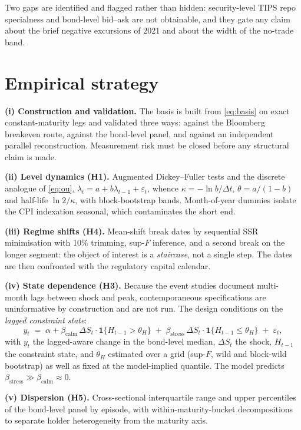 \documentclass[11pt]{article}
\begin{document}
Two gaps are identified and flagged rather than hidden: security-level TIPS repo specialness and bond-level bid--ask are not obtainable, and they gate any claim about the brief negative excursions of 2021 and about the width of the no-trade band.

\section{Empirical strategy}

\textbf{(i) Construction and validation.} The basis is built from \eqref{eq:basis} on exact constant-maturity legs and validated three ways: against the Bloomberg breakeven route, against the bond-level panel, and against an independent parallel reconstruction. Measurement risk must be closed before any structural claim is made.

\textbf{(ii) Level dynamics (H1).} Augmented Dickey--Fuller tests and the discrete analogue of \eqref{eq:ou}, $\lambda_t=a+b\lambda_{t-1}+\varepsilon_t$, whence $\kappa=-\ln b/\Delta t$, $\theta=a/(1-b)$ and half-life $\ln 2/\kappa$, with block-bootstrap bands. Month-of-year dummies isolate the CPI indexation seasonal, which contaminates the short end.

\textbf{(iii) Regime shifts (H4).} Mean-shift break dates by sequential SSR minimisation with 10\% trimming, sup-$F$ inference, and a second break on the longer segment: the object of interest is a \emph{staircase}, not a single step. The dates are then confronted with the regulatory capital calendar.

\textbf{(iv) State dependence (H3).} Because the event studies document multi-month lags between shock and peak, contemporaneous specifications are uninformative by construction and are not run. The design conditions on the \emph{lagged constraint state}:
\begin{equation}
y_t \;=\; \alpha+\beta_{\text{calm}}\,\Delta S_t\cdot\mathbf{1}\{H_{t-1}>\theta_H\}
\;+\;\beta_{\text{stress}}\,\Delta S_t\cdot\mathbf{1}\{H_{t-1}\le\theta_H\}\;+\;\varepsilon_t ,
\label{eq:threshold}
\end{equation}
with $y_t$ the lagged-aware change in the bond-level median, $\Delta S_t$ the shock, $H_{t-1}$ the constraint state, and $\theta_H$ estimated over a grid (sup-$F$, wild and block-wild bootstrap) as well as fixed at the model-implied quantile. The model predicts $\beta_{\text{stress}}\gg\beta_{\text{calm}}\approx0$.

\textbf{(v) Dispersion (H5).} Cross-sectional interquartile range and upper percentiles of the bond-level panel by episode, with within-maturity-bucket decompositions to separate holder heterogeneity from the maturity axis.
\end{document}
